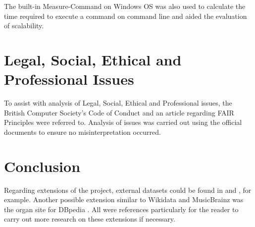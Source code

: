The built-in Measure-Command \cite{measurecommand} on Windows OS was also used to calculate the time required to execute a command on command line and aided the evaluation of scalability. 

\section{Legal, Social, Ethical and Professional Issues}
\hspace{0.5cm} To assist with analysis of Legal, Social, Ethical and Professional issues, the British Computer Society's Code of Conduct \cite{bcs} and an article regarding FAIR Principles \cite{fairprinciples} were referred to. Analysis of issues was carried out using the official documents to ensure no misinterpretation occurred. 

\section{Conclusion}
\hspace{0.5cm} Regarding extensions of the project, external datasets could be found in \cite{kaggle} and \cite{googledatasetsearch}, for example. Another possible extension similar to Wikidata and MusicBrainz was the organ site for DBpedia \cite{organdbpedia}. All were references particularly for the reader to carry out more research on these extensions if necessary. 